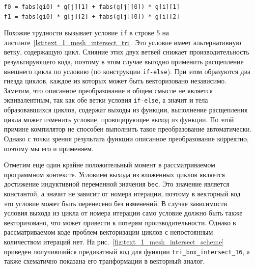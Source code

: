 \begin{singlespace}
\begin{lstlisting}[caption={Использование тождества для векторизации условия.},label={lst:text_4_mesh_intersect_tozh}]
f0 = fabs(gi0) * g[j][1] + fabs(g[j][0]) * g[i][1]
f1 = fabs(gi0) * g[j][2] + fabs(g[j][0]) * g[i][2]
\end{lstlisting}
\end{singlespace}

Похожие трудности вызывает условие \texttt{if} в строке 5 на листинге~\ref{lst:text_1_mesh_intersect_tri}.
Это условие имеет альтернативную ветку, содержащую цикл.
Слияние этих двух ветвей снижает производительность результирующего кода, поэтому в этом случае выгодно применить расщепление внешнего цикла по условию\label{term:loop_split_by_cond3} (по конструкции \texttt{if-else}).
При этом образуются два гнезда циклов, каждое из которых может быть векторизовано независимо.
Заметим, что описанное преобразование в общем смысле не является эквивалентным, так как обе ветки условия \texttt{if-else}, а значит и тела образовавшихся циклов, содержат выходы из функции, выполнение расщепления цикла может изменить условие, провоцирующее выход из функции.
По этой причине компилятор не способен выполнить такое преобразование автоматически.
Однако с точки зрения результата функции описанное преобразование корректно, поэтому мы его и применяем.

Отметим еще один крайне положительный момент в рассматриваемом программном контексте.
Условием выхода из вложенных циклов является достижение индуктивной переменной значения \texttt{bec}.
Это значение является константой, а значит не зависит от номера итерации, поэтому в векторный код это условие может быть перенесено без изменений.
В случае зависимости условия выхода из цикла от номера итерации само условие должно быть также векторизовано, что может привести к потерям производительности.
Однако в рассматриваемом коде проблем векторизации циклов с непостоянным количеством итераций нет.
На рис.~\ref{fig:text_1_mesh_intersect_scheme} приведен получившийся предикатный код для функции \texttt{tri\_box\_intersect\_16}, а также схематично показана его транформации в векторный аналог.

